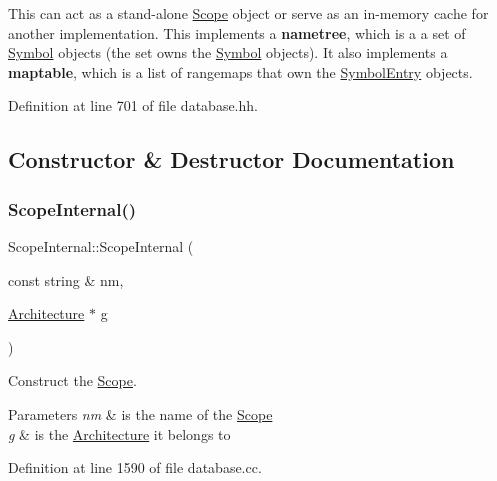 This can act as a stand-\/alone \mbox{\hyperlink{class_scope}{Scope}} object or serve as an in-\/memory cache for another implementation. This implements a {\bfseries{nametree}}, which is a a set of \mbox{\hyperlink{class_symbol}{Symbol}} objects (the set owns the \mbox{\hyperlink{class_symbol}{Symbol}} objects). It also implements a {\bfseries{maptable}}, which is a list of rangemaps that own the \mbox{\hyperlink{class_symbol_entry}{Symbol\+Entry}} objects. 

Definition at line 701 of file database.\+hh.



\subsection{Constructor \& Destructor Documentation}
\mbox{\label{class_scope_internal_af6d824ff10ab3f9afcdfc1ffb206227b}} 
\subsubsection{\texorpdfstring{ScopeInternal()}{ScopeInternal()}}
{\footnotesize\ttfamily Scope\+Internal\+::\+Scope\+Internal (\begin{DoxyParamCaption}\item[{const string \&}]{nm,  }\item[{\mbox{\hyperlink{class_architecture}{Architecture}} $\ast$}]{g }\end{DoxyParamCaption})}



Construct the \mbox{\hyperlink{class_scope}{Scope}}. 


\begin{DoxyParams}{Parameters}
{\em nm} & is the name of the \mbox{\hyperlink{class_scope}{Scope}} \\
\hline
{\em g} & is the \mbox{\hyperlink{class_architecture}{Architecture}} it belongs to \\
\hline
\end{DoxyParams}


Definition at line 1590 of file database.\+cc.

